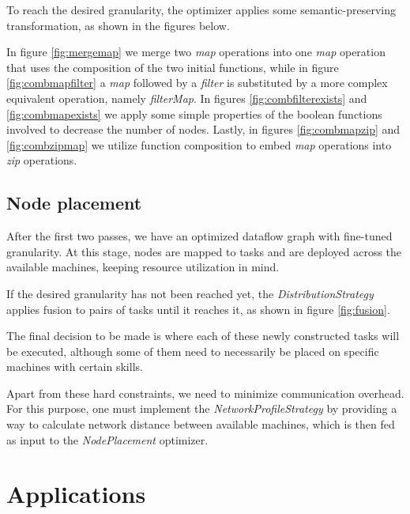 \documentclass[sigplan,review,anonymous]{acmart}
\begin{document}
To reach the desired granularity, the optimizer applies some semantic-preserving
transformation, as shown in the figures below.


In figure \ref{fig:mergemap} we merge two \textit{map} operations into
one \textit{map} operation that uses the composition of the two initial
functions, while in figure \ref{fig:combmapfilter} a \textit{map} followed
by a \textit{filter} is substituted by a more complex equivalent operation,
namely \textit{filterMap}. In figures \ref{fig:combfilterexists} and
\ref{fig:combmapexists} we apply some simple properties of the boolean functions
involved to decrease the number of nodes. Lastly, in figures \ref{fig:combmapzip} and
\ref{fig:combzipmap} we utilize function composition to embed \textit{map}
operations into \textit{zip} operations.

\subsection{Node placement}

After the first two passes, we have an optimized dataflow graph with fine-tuned
granularity. At this stage, nodes are mapped to tasks and are deployed across
the available machines, keeping resource utilization in mind.

If the desired granularity has not been reached yet, the
\textit{DistributionStrategy} applies fusion to pairs of tasks until it reaches
it, as shown in figure \ref{fig:fusion}.


The final decision to be made is where each of these newly constructed tasks
will be executed, although some of them need to necessarily be placed on
specific machines with certain skills.

Apart from these hard constraints, we need to minimize communication overhead.
For this purpose, one must implement the \textit{NetworkProfileStrategy} by providing
a way to calculate network distance between available machines, which is then fed as input
to the \textit{NodePlacement} optimizer.

\section{Applications} \label{sec:applications}
\end{document}
